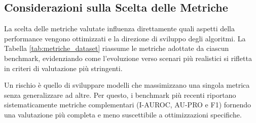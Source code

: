 \subsection{Considerazioni sulla Scelta delle Metriche}
\label{subsec:scelta_metriche}

La scelta delle metriche valutate influenza direttamente quali aspetti della performance vengono ottimizzati e la direzione di sviluppo degli algoritmi. La Tabella \ref{tab:metriche_dataset} riassume le metriche adottate da ciascun benchmark, evidenziando come l'evoluzione verso scenari più realistici si rifletta in criteri di valutazione più stringenti.

Un rischio è quello di sviluppare modelli che massimizzano una singola metrica senza generalizzare ad altre. Per questo, i benchmark più recenti riportano sistematicamente metriche complementari (I-AUROC, AU-PRO e F1) fornendo una valutazione più completa e meno suscettibile a ottimizzazioni specifiche.

